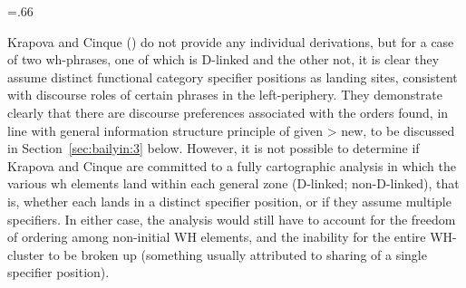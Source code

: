 \documentclass[output=paper]{langscibook}
\begin{document}
\begin{table}
\caption{\label{bai13}\citet[189]{KrapovaCinque2005} summary of Bulgarian WH orders.}
\small\tabcolsep=.66\tabcolsep%
\end{table}

Krapova and Cinque (\citeyear{KrapovaCinque2005}) do not provide any individual derivations, but for a case of two wh-phrases, one of which is D-linked and the other not, it is clear they assume distinct functional category specifier positions as landing sites, consistent with discourse roles of certain phrases in the left-periphery. They demonstrate clearly that there are discourse preferences associated with the orders found, in line with general information structure principle of given > new, to be discussed in Section~\ref{sec:bailyin:3} below. However, it is not possible to determine if Krapova and Cinque are committed to a fully cartographic analysis in which the various wh elements land within each general zone (D-linked; non-D-linked), that is, whether each lands in a distinct specifier position, or if they assume multiple specifiers. In either case, the analysis would still have to account for the freedom of ordering among non-initial WH elements, and the inability for the entire WH-cluster to be broken up (something usually attributed to sharing of a single specifier position).
\end{document}
